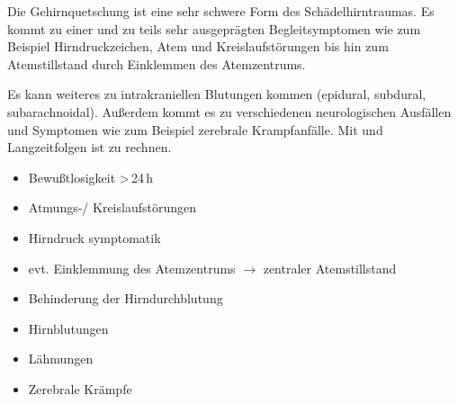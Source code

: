 {
Die Gehirnquetschung ist eine sehr schwere Form des
Schädelhirntraumas. Es kommt zu einer  und zu teils sehr ausgeprägten
Begleitsymptomen wie zum Beispiel Hirndruckzeichen, Atem und
Kreislaufstörungen bis hin zum Atemstillstand durch Einklemmen
des Atemzentrums. 

Es kann weiteres zu intrakraniellen
Blutungen kommen (epidural, subdural, subarachnoidal).
Außerdem kommt es zu verschiedenen neurologischen Ausfällen
und Symptomen wie zum Beispiel zerebrale
Krampfanfälle. Mit  und Langzeitfolgen ist
zu rechnen.
}{
\begin{itemize}
    \item Bewußtlosigkeit  {\textgreater}\,24\,h
    \item Atmungs-/ Kreislaufstörungen
    \item Hirndruck symptomatik
    \item evt. Einklemmung des Atemzentrums ${\rightarrow}$
    zentraler Atemstillstand
    \item Behinderung der Hirndurchblutung
    \item Hirnblutungen
    \item Lähmungen
    \item Zerebrale Krämpfe
\end{itemize}
}{}{}{}






